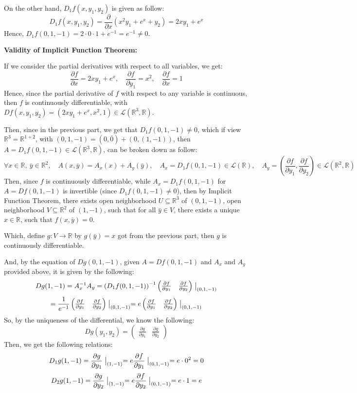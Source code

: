 \documentclass{article}
\begin{document}
On the other hand, $D_1f(x,y_1,y_2)$ is given as follow:
$$D_1f(x,y_1,y_2) = \frac{\partial}{\partial x}(x^2y_1+e^x+y_2) = 2xy_1 + e^x$$
Hence, $D_1f(0,1,-1) = 2\cdot 0\cdot 1 + e^{-1} = e^{-1}\neq 0$.

\hfil

\textbf{Validity of Implicit Function Theorem:}

If we consider the partial derivatives with respect to all variables, we get:
$$\frac{\partial f}{\partial x}=2xy_1+e^x,\quad \frac{\partial f}{\partial y_1} = x^2,\quad \frac{\partial f}{\partial x} = 1$$
Hence, since the partial derivative of $f$ with respect to any variable is continuous, then $f$ is continuously differentiable, with $Df(x,y_1,y_2) = (2xy_1+e^x, x^2, 1)\in\mathcal{L}(\mathbb{R}^3,\mathbb{R})$.

Then, since in the previous part, we get that $D_1f(0,1,-1) \neq 0$, which if view $\mathbb{R}^3 = \mathbb{R}^{1+2}$, with $(0,1,-1) = (0,\bar{0}) + (0,(1,-1))$, then $A = D_1f(0,1,-1)\in\mathcal{L}(\mathbb{R}^3,\mathbb{R})$, can be broken down as follow:
$$\forall x\in\mathbb{R},\ \bar{y}\in\mathbb{R}^2,\quad A(x,\bar{y}) = A_x(x)+A_y(\bar{y}),\quad A_x = D_1f(0,1,-1)\in\mathcal{L}(\mathbb{R}),\quad A_y = \left(\frac{\partial f}{\partial y_1},\frac{\partial f}{\partial y_2}\right)\in\mathcal{L}(\mathbb{R}^2,\mathbb{R})$$
Then, since $f$ is continuously differentiable, while $A_x=D_1f(0,1,-1)$ for $A=Df(0,1,-1)$ is invertible (since $D_1f(0,1,-1) \neq 0$), then by Implicit Function Theorem, there exists open neighborhood $U\subseteq\mathbb{R}^3$ of $(0,1,-1)$, open neighborhood $V\subseteq \mathbb{R}^2$ of $(1,-1)$, such that for all $\bar{y}\in V$, there exists a unique $x\in \mathbb{R}$, such that $f(x,\bar{y}) = 0$.

Which, define $g:V\rightarrow\mathbb{R}$ by $g(\bar{y}) = x$ got from the previous part, then $g$ is continuously differentiable.

And, by the equation of $Dg(0,1,-1)$, given $A = Df(0,1,-1)$ and $A_x$ and $A_y$ provided above, it is given by the following:
$$Dg(1,-1) = A_x^{-1}A_y = \left(D_1f(0,1,-1)\right)^{-1}\begin{pmatrix}\frac{\partial f}{\partial y_1} & \frac{\partial f}{\partial y_2}\end{pmatrix}\bigm|_{(0,1,-1)}$$
$$ = \frac{1}{e^{-1}}\begin{pmatrix}\frac{\partial f}{\partial y_1} & \frac{\partial f}{\partial y_2}\end{pmatrix}\bigm|_{(0,1,-1)} = e\begin{pmatrix}\frac{\partial f}{\partial y_1} & \frac{\partial f}{\partial y_2}\end{pmatrix}\bigm|_{(0,1,-1)}$$
So, by the uniqueness of the differential, we know the following: 
$$Dg(y_1,y_2) = \begin{pmatrix}
    \frac{\partial g}{\partial y_1} & \frac{\partial g}{\partial y_2}
\end{pmatrix}$$
Then, we get the following relations:
$$D_1g(1,-1)=\frac{\partial g}{\partial y_1}\bigm|_{(1,-1)} = e\frac{\partial f}{\partial y_1}\bigm|_{(0,1,-1)} = e\cdot 0^2 = 0$$
$$D_2g(1,-1)=\frac{\partial g}{\partial y_2}\bigm|_{(1,-1)} = e\frac{\partial f}{\partial y_2}\bigm|_{(0,1,-1)} = e\cdot 1 = e$$
 
\end{document}
